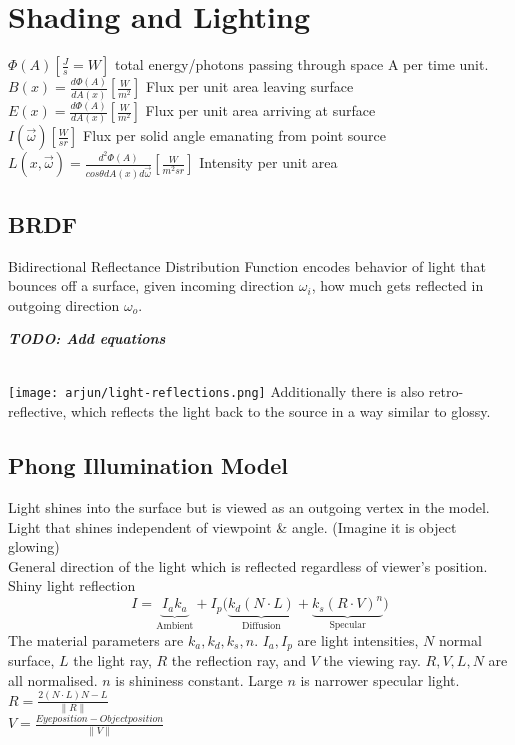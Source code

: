 \section{Shading and Lighting}
 $\Phi(A) [\frac{J}{s} = W]$ total energy/photons passing through space A per time unit.\\
 $B(x) = \frac{d\Phi(A)}{dA(x)} [\frac{W}{m^2}]$ Flux per unit area leaving surface \\
 $E(x) = \frac{d\Phi(A)}{dA(x)}[\frac{W}{m^2}]$ Flux per unit area arriving at surface\\
 $I(\overrightarrow{\omega}) [\frac{W}{sr}]$ Flux per solid angle emanating from point source\\
 $L(x, \overrightarrow{\omega}) = \frac{d^2 \Phi(A)}{cos\theta dA(x) d\overrightarrow{\omega}} [\frac{W}{m^2 sr}]$ Intensity per unit area
\subsection*{BRDF}
Bidirectional Reflectance Distribution Function encodes behavior of light that bounces off a surface, given incoming direction $\omega_i$, how much gets reflected in outgoing direction $\omega_o$. 


\textit{\textbf{TODO: Add equations }}

\\
\texttt{[image: arjun/light-reflections.png]}
Additionally there is also retro-reflective, which reflects the light back to the source in a way similar to glossy. 
\subsection*{Phong Illumination Model}
Light shines into the surface but is viewed as an outgoing vertex in the model.\\
 Light that shines independent of viewpoint \& angle. (Imagine it is object glowing) \\
 General direction of the light which is reflected regardless of viewer's position.\\
 Shiny light reflection
$$I = \underbrace{I_ak_a }_\text{Ambient} + I_p \bigl( \underbrace{k_d(N \cdot L)}_\text{Diffusion} + \underbrace{k_s(R \cdot V)^n}_\text{Specular} \bigr)$$
The material parameters are $k_a, k_d, k_s, n$. $I_a, I_p$ are light intensities, $N$ normal surface, $L$ the light ray, $R$ the reflection ray, and $V$ the viewing ray. $R, V, L, N$ are all normalised. $n$ is shininess constant. Large $n$ is narrower specular light. \\
$R = \frac{2(N \cdot L)N - L}{\lVert R \rVert} $ \\
$V = \frac{Eye position - Object position}{\lVert V \rVert} $
